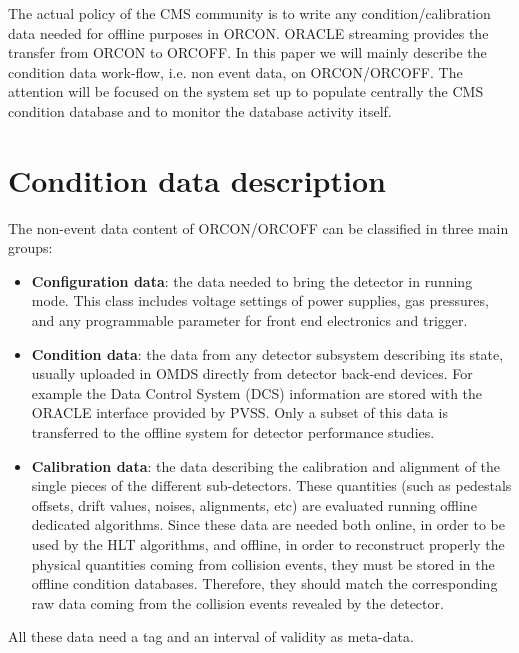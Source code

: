 \documentclass[a4paper]{jpconf}
\begin{document}
The actual policy of the CMS community is to write any condition/calibration data needed for offline purposes in ORCON. ORACLE streaming provides the transfer from ORCON to ORCOFF. 
In this paper we will mainly describe the condition data work-flow, i.e. non event data, on ORCON/ORCOFF. The attention will be focused on the system set up to populate centrally the CMS condition database and to monitor the database activity itself. 

\section{Condition data description}
The non-event data content of ORCON/ORCOFF can be classified in three main groups:
\begin {itemize}
\item {\bf Configuration data}: the data needed to bring the detector in running mode. 
This class includes voltage settings of power supplies, gas pressures, and any programmable parameter for front end electronics and trigger. 
\item {\bf Condition data}: the data from any detector subsystem describing its state, usually uploaded in OMDS directly from detector back-end devices. For example the Data Control System (DCS) information are stored with the ORACLE interface provided by PVSS\cite{PVSS}. 
Only a subset of this data is transferred to the offline system for detector performance studies.  
\item {\bf Calibration data}: the data describing the calibration and alignment of the single pieces of the different sub-detectors. 
These quantities (such as pedestals offsets, drift values, noises, alignments, etc) are evaluated running offline dedicated algorithms. 
Since these data are needed both online, in order to be used by the HLT algorithms, and offline, in order to reconstruct properly the physical quantities coming from collision events, they must be stored in the offline condition databases.
Therefore, they should match the corresponding raw data coming from the collision events revealed by the detector.
\end{itemize}   

All these data need a tag and an interval of validity as meta-data.
\end{document}
